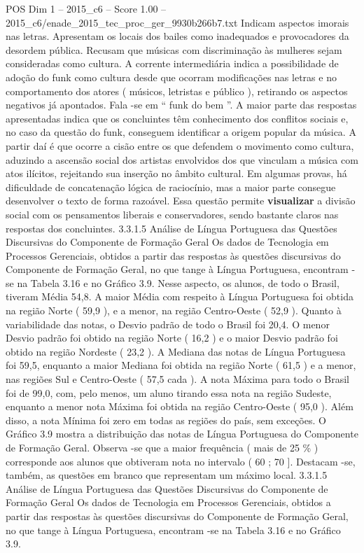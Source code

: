 \begin{textsample}{POS Dim 1 – 2015\_c6 – Score 1.00 – 2015\_c6/enade\_2015\_tec\_proc\_ger\_9930b266b7.txt}
Indicam aspectos imorais nas letras.
Apresentam os locais dos bailes como inadequados e provocadores da desordem pública.
Recusam que músicas com discriminação às mulheres sejam consideradas como cultura.
A corrente intermediária indica a possibilidade de adoção do funk como cultura desde que ocorram modificações nas letras e no comportamento dos atores ( músicos, letristas e público ), retirando os aspectos negativos já apontados.
Fala -se em “ funk do bem ”.
A maior parte das respostas apresentadas indica que os concluintes têm conhecimento dos conflitos sociais e, no caso da questão do funk, conseguem identificar a origem popular da música.
A partir daí é que ocorre a cisão entre os que defendem o movimento como cultura, aduzindo a ascensão social dos artistas envolvidos dos que vinculam a música com atos ilícitos, rejeitando sua inserção no âmbito cultural.
Em algumas provas, há dificuldade de concatenação lógica de raciocínio, mas a maior parte consegue desenvolver o texto de forma razoável.
Essa questão permite \textbf{visualizar} a divisão social com os pensamentos liberais e conservadores, sendo bastante claros nas respostas dos concluintes. 3.3.1.5 Análise de Língua Portuguesa das Questões Discursivas do Componente de Formação Geral Os dados de Tecnologia em Processos Gerenciais, obtidos a partir das respostas às questões discursivas do Componente de Formação Geral, no que tange à Língua Portuguesa, encontram -se na Tabela 3.16 e no Gráfico 3.9.
Nesse aspecto, os alunos, de todo o Brasil, tiveram Média 54,8.
A maior Média com respeito à Língua Portuguesa foi obtida na região Norte ( 59,9 ), e a menor, na região Centro-Oeste ( 52,9 ).
Quanto à variabilidade das notas, o Desvio padrão de todo o Brasil foi 20,4.
O menor Desvio padrão foi obtido na região Norte ( 16,2 ) e o maior Desvio padrão foi obtido na região Nordeste ( 23,2 ).
A Mediana das notas de Língua Portuguesa foi 59,5, enquanto a maior Mediana foi obtida na região Norte ( 61,5 ) e a menor, nas regiões Sul e Centro-Oeste ( 57,5 cada ).
A nota Máxima para todo o Brasil foi de 99,0, com, pelo menos, um aluno tirando essa nota na região Sudeste, enquanto a menor nota Máxima foi obtida na região Centro-Oeste ( 95,0 ).
Além disso, a nota Mínima foi zero em todas as regiões do país, sem exceções.
O Gráfico 3.9 mostra a distribuição das notas de Língua Portuguesa do Componente de Formação Geral.
Observa -se que a maior frequência ( mais de 25 \% ) corresponde aos alunos que obtiveram nota no intervalo ( 60 ; 70 ].
Destacam -se, também, as questões em branco que representam um máximo local. 3.3.1.5 Análise de Língua Portuguesa das Questões Discursivas do Componente de Formação Geral Os dados de Tecnologia em Processos Gerenciais, obtidos a partir das respostas às questões discursivas do Componente de Formação Geral, no que tange à Língua Portuguesa, encontram -se na Tabela 3.16 e no Gráfico 3.9.

\end{textsample}
